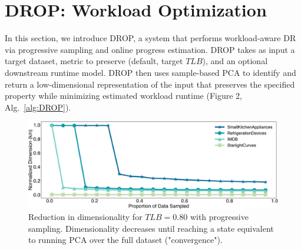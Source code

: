 \section{DROP: Workload Optimization}
\label{sec:algo}

In this section, we introduce DROP, a system that performs workload-aware DR via progressive sampling and online progress estimation.
DROP takes as input a target dataset, metric to preserve (default, target $TLB$), and an optional downstream runtime model.
DROP then uses sample-based PCA to identify and return a low-dimensional representation of the input that preserves the specified property while minimizing estimated workload runtime (Figure 2, Alg.~\ref{alg:DROP}).

\begin{figure}
\includegraphics[width=\linewidth]{figs/progressive.pdf}
\caption[]{ Reduction in dimensionality for  $TLB = 0.80$ with progressive sampling. Dimensionality decreases until reaching a state equivalent to running PCA over the full dataset ("convergence").}
\label{fig:progressive}
\end{figure}

